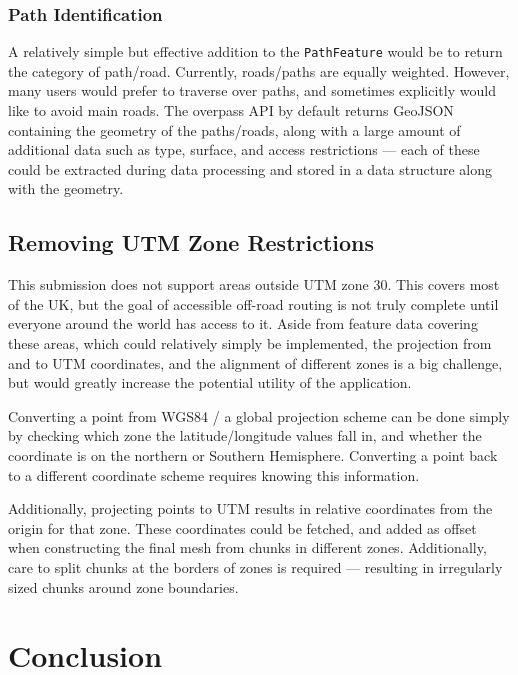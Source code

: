 \documentclass[12pt]{article}
\begin{document}
\subsubsection{Path Identification}\label{section:improvements:paths}

A relatively simple but effective addition to the \texttt{PathFeature} would be to return the category of path/road. Currently, roads/paths are equally weighted. However, many users would prefer to traverse over paths, and sometimes explicitly would like to avoid main roads. The overpass API by default returns GeoJSON containing the geometry of the paths/roads, along with a large amount of additional data such as type, surface, and access restrictions --- each of these could be extracted during data processing and stored in a data structure along with the geometry.

\subsection{Removing UTM Zone Restrictions}\label{section:improvements:zones}

This submission does not support areas outside UTM zone 30. This covers most of the UK, but the goal of accessible off-road routing is not truly complete until everyone around the world has access to it. Aside from feature data covering these areas, which could relatively simply be implemented, the projection from and to UTM coordinates, and the alignment of different zones is a big challenge, but would greatly increase the potential utility of the application.

Converting a point from WGS84 / a global projection scheme can be done simply by checking which zone the latitude/longitude values fall in, and whether the coordinate is on the northern or Southern Hemisphere. Converting a point back to a different coordinate scheme requires knowing this information.

Additionally, projecting points to UTM results in relative coordinates from the origin for that zone. These coordinates could be fetched, and added as offset when constructing the final mesh from chunks in different zones. Additionally, care to split chunks at the borders of zones is required --- resulting in irregularly sized chunks around zone boundaries.

\section{Conclusion}
\end{document}
